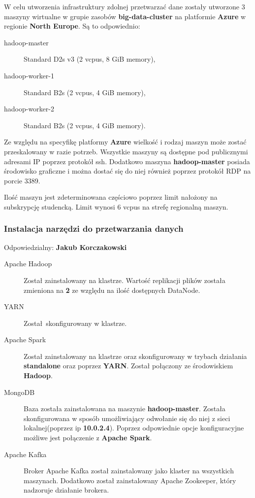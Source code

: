 \documentclass[a4paper,11pt, notitlepage ]{article}
\begin{document}
    W celu utworzenia infrastruktury zdolnej przetwarzać dane zostały utworzone 3 maszyny wirtualne w grupie zasobów \textbf{big-data-cluster
    } na platformie \textbf{Azure} w regionie \textbf{North Europe}. Są to odpowiednio:
    \begin{description}
        \item[hadoop-master] Standard D2s v3 (2 vcpus, 8 GiB memory),
        \item[hadoop-worker-1] Standard B2s (2 vcpus, 4 GiB memory),
        \item[hadoop-worker-2] Standard B2s (2 vcpus, 4 GiB memory). 
    \end{description}

    Ze względu na specyfikę platformy \textbf{Azure} wielkość i rodzaj maszyn może zostać przeskalowany w razie potrzeb. Wszystkie maszyny są dostępne pod publicznymi adresami IP poprzez protokół ssh. Dodatkowo maszyna \textbf{hadoop-master} posiada środowisko graficzne i można dostać się do niej również poprzez protokół RDP na porcie 3389.

    Ilość maszyn jest zdeterminowana częściowo poprzez limit nałożony na subskrypcję studencką. Limit wynosi 6 vcpus na strefę regionalną maszyn.

    \subsubsection{Instalacja narzędzi do przetwarzania danych}
    Odpowiedzialny: \textbf{Jakub Korczakowski}\\
    \begin{description}
        \item[Apache Hadoop] Został zainstalowany na klastrze. Wartość replikacji plików została zmieniona na \textbf{2} ze względu na ilość dostępnych DataNode.
        \item[YARN] Został skonfigurowany w klastrze.
        \item[Apache Spark]  Został zainstalowany na klastrze oraz skonfigurowany w trybach działania \textbf{standalone} oraz poprzez  \textbf{YARN}. Został połączony ze środowiskiem \textbf{Hadoop}.
        \item[MongoDB] Baza została zainstalowana na maszynie \textbf{hadoop-master}. Została skonfigurowana w sposób umożliwiający odwołanie się do niej z sieci lokalnej(poprzez ip \textbf{10.0.2.4}). Poprzez odpowiednie opcje konfiguracyjne możliwe jest połączenie z \textbf{Apache Spark}.
        \item[Apache Kafka] Broker Apache Kafka został zainstalowany jako klaster na wszystkich maszynach. Dodatkowo został zainstalowany Apache Zookeeper, który nadzoruje działanie brokera. 
    \end{description}   
    
\end{document}
